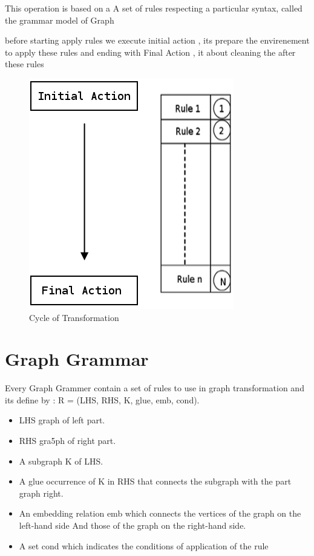  
This operation is based on a
A set of rules respecting a particular syntax, called the grammar model of
Graph

before starting apply rules we execute initial action , 
its prepare the envirenement to apply these rules
and ending with Final Action , it about cleaning the after these rules
\cite{ ch3-bid , ch3-spec }
\begin{figure}[th]
	\centering
		\includegraphics[scale=0.6]{Chapiter3/img/transGrammar}
	\caption{\label{fig:Cycle of Tranformation}Cycle of Transformation\cite{ch3-img}}
\end{figure} 

 
\section{Graph Grammar} 
Every Graph Grammer contain a set of rules  to use in graph transformation
and its define by :  \cite{ ch3-doc , ch3-spec }
R = (LHS, RHS, K, glue, emb, cond). 
\begin{itemize}
 
\item LHS graph of left part.
\item RHS gra5ph of right part.
\item A subgraph K of LHS.
\item A glue occurrence of K in RHS that connects the subgraph with the part graph  right.
\item An embedding relation emb which connects the vertices of the graph on the left-hand side
And those of the graph on the right-hand side.
\item A set cond which indicates the conditions of application of the rule
\end{itemize}

